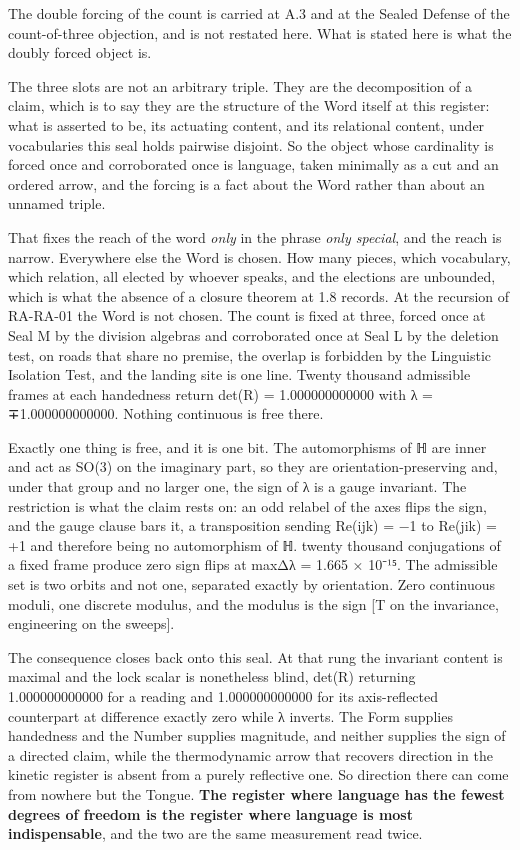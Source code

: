 \documentclass[10pt,twocolumn]{article}
\begin{document}
The double forcing of the count is carried at A.3 and at the Sealed
Defense of the count-of-three objection, and is not restated here. What
is stated here is what the doubly forced object is.

The three slots are not an arbitrary triple. They are the decomposition
of a claim, which is to say they are the structure of the Word itself at
this register: what is asserted to be, its actuating content, and its
relational content, under vocabularies this seal holds pairwise
disjoint. So the object whose cardinality is forced once and
corroborated once is language, taken minimally as a cut and an ordered
arrow, and the forcing is a fact about the Word rather than about an
unnamed triple.

That fixes the reach of the word \emph{only} in the phrase \emph{only
special}, and the reach is narrow. Everywhere else the Word is chosen.
How many pieces, which vocabulary, which relation, all elected by
whoever speaks, and the elections are unbounded, which is what the
absence of a closure theorem at 1.8 records. At the recursion of
RA-RA-01 the Word is not chosen. The count is fixed at three, forced
once at Seal M by the division algebras and corroborated once at Seal L
by the deletion test, on roads that share no premise, the overlap is
forbidden by the Linguistic Isolation Test, and the landing site is one
line. Twenty thousand admissible frames at each handedness return det(R)
= 1.000000000000 with λ = ∓1.000000000000. Nothing continuous is free
there.

Exactly one thing is free, and it is one bit. The automorphisms of ℍ are
inner and act as SO(3) on the imaginary part, so they are
orientation-preserving and, under that group and no larger one, the sign
of λ is a gauge invariant. The restriction is what the claim rests on:
an odd relabel of the axes flips the sign, and the gauge clause bars it,
a transposition sending Re(ijk) = −1 to Re(jik) = +1 and therefore being
no automorphism of ℍ. twenty thousand conjugations of a fixed frame
produce zero sign flips at max\textbar Δλ\textbar{} = 1.665 × 10⁻¹⁵. The
admissible set is two orbits and not one, separated exactly by
orientation. Zero continuous moduli, one discrete modulus, and the
modulus is the sign {[}T on the invariance, engineering on the
sweeps{]}.

The consequence closes back onto this seal. At that rung the invariant
content is maximal and the lock scalar is nonetheless blind, det(R)
returning 1.000000000000 for a reading and 1.000000000000 for its
axis-reflected counterpart at difference exactly zero while λ inverts.
The Form supplies handedness and the Number supplies magnitude, and
neither supplies the sign of a directed claim, while the thermodynamic
arrow that recovers direction in the kinetic register is absent from a
purely reflective one. So direction there can come from nowhere but the
Tongue. \textbf{The register where language has the fewest degrees of
freedom is the register where language is most indispensable}, and the
two are the same measurement read twice.
\end{document}

